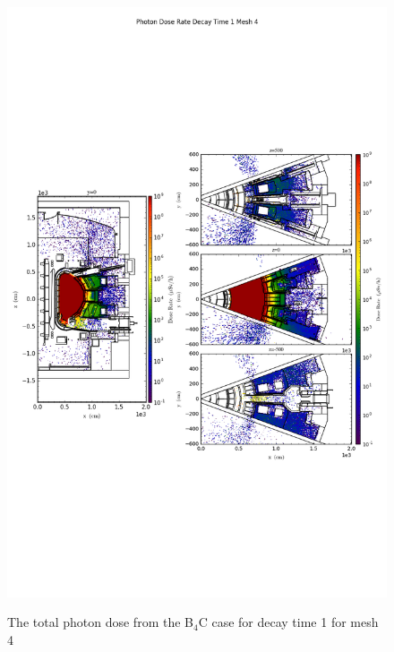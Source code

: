 \begin{figure}[ht!]
\centering
\includegraphics[trim={0cm 9cm 0cm 10cm},clip,scale=0.75]{../plots/final_model_with_b4c/Photon_Dose_Rate_Decay_Time_1_Mesh_4.png}
\label{fig:photons_dc1_no4bc_m4_flux}
\caption{The total photon dose from the B$_4$C case for decay time 1 for mesh 4}
\end{figure}
